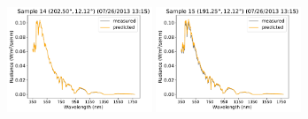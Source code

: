 \begin{center}
\includegraphics[width=0.325\textwidth]{img/07261315_s14.pdf}
\includegraphics[width=0.325\textwidth]{img/07261315_s15.pdf}
\end{center}

\mbox{}
\clearpage
